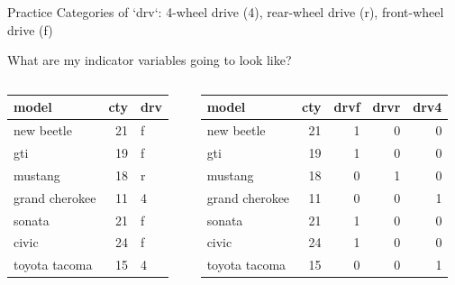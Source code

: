 \documentclass{beamer}
\begin{document}
\begin{frame}{Practice}
\scriptsize
Categories of `drv`: 4-wheel drive (4), rear-wheel drive (r), front-wheel drive (f) \vspace{3mm}

What are my indicator variables going to look like?
\begin{columns}
\begin{column}{0.3\textwidth}
\begin{table}[ht]
\centering
\begin{tabular}{lrl}
  \hline
model & cty & drv \\ 
  \hline
new beetle &  21 & f \\ 
  gti &  19 & f \\ 
  mustang &  18 & r \\ 
  grand cherokee &  11 & 4 \\ 
  sonata &  21 & f \\ 
  civic &  24 & f \\ 
  toyota tacoma &  15 & 4 \\ 
   \hline
\end{tabular}
\end{table}
\end{column}
\begin{column}{0.5\textwidth}  %
\vspace{3mm}
\begin{table}[ht]
\centering
\begin{tabular}{lrrrr}
  \hline
model & cty & drvf & drvr & drv4 \\ 
  \hline
new beetle & 21 & 1 & 0 & 0 \\ 
  gti & 19 & 1 & 0 & 0 \\ 
  mustang & 18 & 0 & 1 & 0 \\ 
  grand cherokee & 11 & 0 & 0 & 1 \\ 
  sonata & 21 & 1 & 0 & 0 \\ 
  civic & 24 & 1 & 0 & 0 \\ 
  toyota tacoma & 15 & 0 & 0 & 1 \\ 
   \hline
\end{tabular}
\end{table}
\end{column}
\end{columns}
\end{frame}
\end{document}
